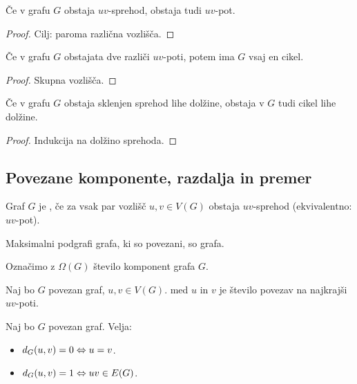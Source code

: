 \begin{lema}
    Če v grafu $G$ obstaja $uv$-sprehod, obstaja tudi $uv$-pot.
\end{lema}

\begin{proof}
    Cilj: paroma različna vozlišča.
\end{proof}

\begin{lema}
    Če v grafu $G$ obstajata dve različi $uv$-poti, potem ima $G$ vsaj en cikel.
\end{lema}

\begin{proof}
    Skupna vozlišča.
\end{proof}

\begin{lema}
    Če v grafu $G$ obstaja sklenjen sprehod lihe dolžine, obstaja v $G$ tudi cikel lihe dolžine.
\end{lema}

\begin{proof}
    Indukcija na dolžino sprehoda.
\end{proof}

\subsection{Povezane komponente, razdalja in premer}
\begin{definicija}
    Graf $G$ je , če za vsak par vozlišč $u, v \in V(G)$ obstaja $uv$-sprehod (ekvivalentno: $uv$-pot).
\end{definicija}

\begin{definicija}
    Maksimalni podgrafi grafa, ki so povezani, so  grafa. 
\end{definicija}
Označimo z $\Omega(G)$ število komponent grafa $G$.

\begin{definicija}
    Naj bo $G$ povezan graf, $u, v \in V(G)$.  med $u$ in $v$ je število povezav na najkrajši $uv$-poti.
\end{definicija}

\begin{opomba}
    Naj bo $G$ povezan graf. Velja:
    \begin{itemize}
        \item $d_G(u,v) = 0 \Leftrightarrow u = v$.
        \item $d_G(u,v) = 1 \Leftrightarrow uv \in E(G)$.
    \end{itemize}
\end{opomba}

